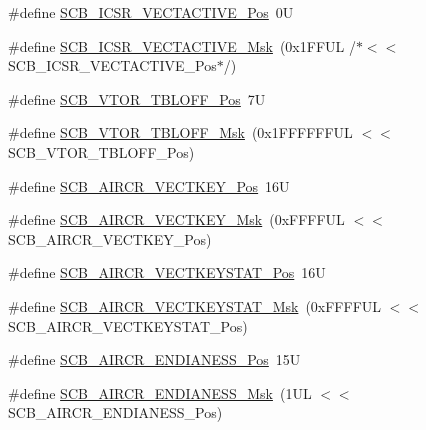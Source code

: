 \begin{DoxyCompactItemize}
\item 
\#define \mbox{\hyperlink{group___c_m_s_i_s___s_c_b_gae4f602c7c5c895d5fb687b71b0979fc3}{S\+C\+B\+\_\+\+I\+C\+S\+R\+\_\+\+V\+E\+C\+T\+A\+C\+T\+I\+V\+E\+\_\+\+Pos}}~0U
\item 
\#define \mbox{\hyperlink{group___c_m_s_i_s___s_c_b_ga5533791a4ecf1b9301c883047b3e8396}{S\+C\+B\+\_\+\+I\+C\+S\+R\+\_\+\+V\+E\+C\+T\+A\+C\+T\+I\+V\+E\+\_\+\+Msk}}~(0x1\+F\+F\+U\+L /$\ast$$<$$<$ S\+C\+B\+\_\+\+I\+C\+S\+R\+\_\+\+V\+E\+C\+T\+A\+C\+T\+I\+V\+E\+\_\+\+Pos$\ast$/)
\item 
\#define \mbox{\hyperlink{group___c_m_s_i_s___s_c_b_gac6a55451ddd38bffcff5a211d29cea78}{S\+C\+B\+\_\+\+V\+T\+O\+R\+\_\+\+T\+B\+L\+O\+F\+F\+\_\+\+Pos}}~7U
\item 
\#define \mbox{\hyperlink{group___c_m_s_i_s___s_c_b_ga75e395ed74042923e8c93edf50f0996c}{S\+C\+B\+\_\+\+V\+T\+O\+R\+\_\+\+T\+B\+L\+O\+F\+F\+\_\+\+Msk}}~(0x1\+F\+F\+F\+F\+F\+F\+U\+L $<$$<$ S\+C\+B\+\_\+\+V\+T\+O\+R\+\_\+\+T\+B\+L\+O\+F\+F\+\_\+\+Pos)
\item 
\#define \mbox{\hyperlink{group___c_m_s_i_s___s_c_b_gaaa27c0ba600bf82c3da08c748845b640}{S\+C\+B\+\_\+\+A\+I\+R\+C\+R\+\_\+\+V\+E\+C\+T\+K\+E\+Y\+\_\+\+Pos}}~16U
\item 
\#define \mbox{\hyperlink{group___c_m_s_i_s___s_c_b_ga90c7cf0c490e7ae55f9503a7fda1dd22}{S\+C\+B\+\_\+\+A\+I\+R\+C\+R\+\_\+\+V\+E\+C\+T\+K\+E\+Y\+\_\+\+Msk}}~(0x\+F\+F\+F\+F\+U\+L $<$$<$ S\+C\+B\+\_\+\+A\+I\+R\+C\+R\+\_\+\+V\+E\+C\+T\+K\+E\+Y\+\_\+\+Pos)
\item 
\#define \mbox{\hyperlink{group___c_m_s_i_s___s_c_b_gaec404750ff5ca07f499a3c06b62051ef}{S\+C\+B\+\_\+\+A\+I\+R\+C\+R\+\_\+\+V\+E\+C\+T\+K\+E\+Y\+S\+T\+A\+T\+\_\+\+Pos}}~16U
\item 
\#define \mbox{\hyperlink{group___c_m_s_i_s___s_c_b_gabacedaefeefc73d666bbe59ece904493}{S\+C\+B\+\_\+\+A\+I\+R\+C\+R\+\_\+\+V\+E\+C\+T\+K\+E\+Y\+S\+T\+A\+T\+\_\+\+Msk}}~(0x\+F\+F\+F\+F\+U\+L $<$$<$ S\+C\+B\+\_\+\+A\+I\+R\+C\+R\+\_\+\+V\+E\+C\+T\+K\+E\+Y\+S\+T\+A\+T\+\_\+\+Pos)
\item 
\#define \mbox{\hyperlink{group___c_m_s_i_s___s_c_b_gad31dec98fbc0d33ace63cb1f1a927923}{S\+C\+B\+\_\+\+A\+I\+R\+C\+R\+\_\+\+E\+N\+D\+I\+A\+N\+E\+S\+S\+\_\+\+Pos}}~15U
\item 
\#define \mbox{\hyperlink{group___c_m_s_i_s___s_c_b_ga2f571f93d3d4a6eac9a3040756d3d951}{S\+C\+B\+\_\+\+A\+I\+R\+C\+R\+\_\+\+E\+N\+D\+I\+A\+N\+E\+S\+S\+\_\+\+Msk}}~(1\+U\+L $<$$<$ S\+C\+B\+\_\+\+A\+I\+R\+C\+R\+\_\+\+E\+N\+D\+I\+A\+N\+E\+S\+S\+\_\+\+Pos)

\end{DoxyCompactItemize}
